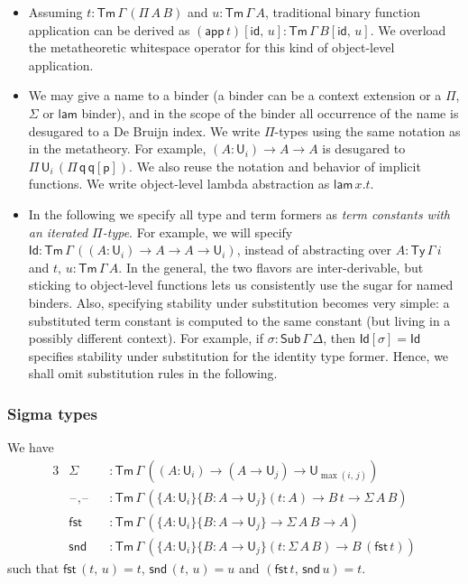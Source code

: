 \documentclass[acmsmall,screen,review,anonymous]{acmart}
\newcommand{\msf}[1]{{\mathsf{#1}}}
\newcommand{\p}{\mathsf{p}}
\newcommand{\q}{\mathsf{q}}
\newcommand{\U}{\msf{U}}
\newcommand{\blank}{{\mathord{\hspace{1pt}\text{--}\hspace{1pt}}}}
\newcommand{\fst}{\msf{fst}}
\newcommand{\snd}{\msf{snd}}
\newcommand{\id}{\msf{id}}
\newcommand{\Sub}{\msf{Sub}}
\newcommand{\Ty}{\msf{Ty}}
\newcommand{\Tm}{\msf{Tm}}
\newcommand{\lam}{\msf{lam}}
\newcommand{\app}{\msf{app}}
\newcommand{\Id}{\msf{Id}}
\begin{document}
\begin{itemize}
\item Assuming $t : \Tm\,\Gamma\,(\Pi\,A\,B)$ and $u : \Tm\,\Gamma\,A$, traditional binary function
  application can be derived as $(\app\,t)[\id,\,u] : \Tm\,\Gamma\,B[\id,\,u]$. We overload the
  metatheoretic whitespace operator for this kind of object-level application.
\item We may give a name to a binder (a binder can be a context extension or a $\Pi$, $\Sigma$ or
  $\lam$ binder), and in the scope of the binder all occurrence of the name is desugared to a De
  Bruijn index.  We write $\Pi$-types using the same notation as in the metatheory. For example, $(A
  : \U_i) \to A \to A$ is desugared to $\Pi\,\U_i\,(\Pi\,\q\,\q[\p])$. We also reuse the notation
  and behavior of implicit functions. We write object-level lambda abstraction as $\lam\,x.t$.
\item
  In the following we specify all type and term formers as \emph{term constants with an iterated
  $\Pi$-type}.  For example, we will specify $\Id : \Tm\,\Gamma\,((A : \U_i) \to A \to A \to \U_i)$,
  instead of abstracting over $A : \Ty\,\Gamma\,i$ and $t,\,u : \Tm\,\Gamma\,A$. In the general, the
  two flavors are inter-derivable, but sticking to object-level functions lets us consistently use
  the sugar for named binders. Also, specifying stability under substitution becomes very simple: a
  substituted term constant is computed to the same constant (but living in a possibly different
  context). For example, if $\sigma : \Sub\,\Gamma\,\Delta$, then $\Id[\sigma] = \Id$ specifies
  stability under substitution for the identity type former. Hence, we shall omit substitution rules
  in the following.
\end{itemize}

\subsubsection{Sigma types} We have
\begin{alignat*}{3}
  &\Sigma        &&: \Tm\,\Gamma\,((A : \U_i) \to (A \to \U_j) \to \U_{\max(i,\,j)}) \\
  &\blank,\blank &&: \Tm\,\Gamma\,(\{A : \U_i\}\{B : A \to \U_j\}(t : A) \to B\,t \to \Sigma\,A\,B)\\
  &\fst          &&: \Tm\,\Gamma\,(\{A : \U_i\}\{B : A \to \U_j\} \to \Sigma\,A\,B \to A)\\
  &\snd          &&: \Tm\,\Gamma\,(\{A : \U_i\}\{B : A \to \U_j\}(t : \Sigma\,A\,B) \to B\,(\fst\,t))
\end{alignat*}
such that $\fst\,(t,\,u) = t$, $\snd\,(t,\,u) = u$ and $(\fst\,t,\,\snd\,u) = t$.
\end{document}

